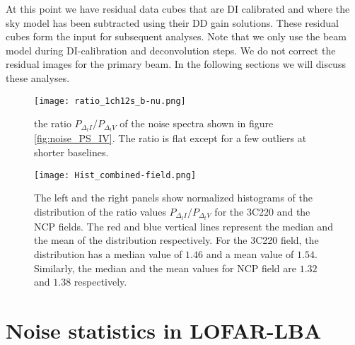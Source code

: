 \documentclass[fleqn,usenatbib]{mnras}
\begin{document}
At this point we have residual data cubes that are DI calibrated and where the sky model has been subtracted using their DD gain solutions. These residual cubes form the input for subsequent analyses. Note that we only use the beam model during DI-calibration and deconvolution steps. We do not correct the residual images for the primary beam. In the following sections we will discuss these analyses.

\begin{figure}
\centering
\texttt{[image: ratio\_1ch12s\_b-nu.png]}
    \caption{the ratio $P_{\Delta_t I} / P_{\Delta_t V}$ of the noise spectra shown in figure \ref{fig:noise_PS_IV}. The ratio is flat except for a few outliers at shorter baselines.} 
\label{fig:Ratio_noise_PS_IV}
\end{figure} 

\begin{figure*}
\centering
\texttt{[image: Hist\_combined-field.png]}
    \caption{The left and the right panels show normalized histograms of the distribution of the ratio values $P_{\Delta_t I} / P_{\Delta_t V}$ for the 3C220 and the NCP fields. The red and blue vertical lines represent the median and the mean of the distribution respectively. For the 3C220 field, the distribution has a median value of $1.46$ and a mean value of $1.54$. Similarly, the median and the mean values for NCP field are $1.32$ and $1.38$ respectively.} 
\label{fig:Hist_noise-ratio}
\end{figure*} 

\section{Noise statistics in LOFAR-LBA}\label{sec:LBAnoise}
\end{document}

